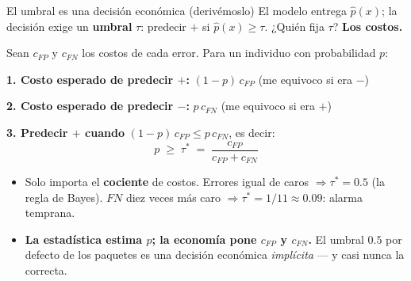 \documentclass{beamer}
\newcommand{\1}{\mathbb{I}}
\begin{document}
\begin{frame}{El umbral es una decisión económica (derivémoslo)}
\small
El modelo entrega $\hat{p}(x)$; la decisión exige un \textbf{umbral} $\tau$: predecir $+$ si $\hat{p}(x) \geq \tau$. ¿Quién fija $\tau$? \textbf{Los costos.}
\pause

\vspace{0.15cm}
Sean $c_{FP}$ y $c_{FN}$ los costos de cada error. Para un individuo con probabilidad $p$:
\vspace{0.1cm}

\textbf{1. Costo esperado de predecir $+$:} \quad $(1 - p)\, c_{FP}$ \hfill (me equivoco si era $-$)

\textbf{2. Costo esperado de predecir $-$:} \quad $p\, c_{FN}$ \hfill (me equivoco si era $+$)
\pause

\textbf{3. Predecir $+$ cuando} $(1-p)\,c_{FP} \leq p\, c_{FN}$, es decir:
\[ \boxed{ \; p \;\geq\; \tau^{*} \;=\; \frac{c_{FP}}{c_{FP} + c_{FN}} \; } \]
\pause

\begin{itemize}\itemsep4pt
  \item Solo importa el \textbf{cociente} de costos. Errores igual de caros $\Rightarrow \tau^* = 0.5$ (la regla de Bayes). $FN$ diez veces más caro $\Rightarrow \tau^* = 1/11 \approx 0.09$: alarma temprana.
  \item \textbf{La estadística estima $p$; la economía pone $c_{FP}$ y $c_{FN}$.} El umbral $0.5$ por defecto de los paquetes es una decisión económica \emph{implícita} --- y casi nunca la correcta.
\end{itemize}
\end{frame}
\end{document}
